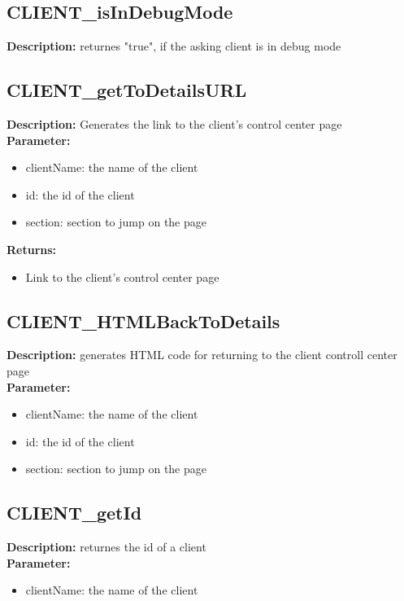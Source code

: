 \subsection{CLIENT\_isInDebugMode}
\textbf{Description:} returnes "true", if the asking client is in debug mode\\

\subsection{CLIENT\_getToDetailsURL}
\textbf{Description:} Generates the link to the client's control center page\\
\textbf{Parameter:}
\begin{itemize}
\item clientName: the name of the client
\item id: the id of the client
\item section: section to jump on the page
\end{itemize}
\textbf{Returns:}
\begin{itemize}
\item Link to the client's control center page
\end{itemize}

\subsection{CLIENT\_HTMLBackToDetails}
\textbf{Description:} generates HTML code for returning to the client controll center page\\
\textbf{Parameter:}
\begin{itemize}
\item clientName: the name of the client
\item id: the id of the client
\item section: section to jump on the page
\end{itemize}

\subsection{CLIENT\_getId}
\textbf{Description:} returnes the id of a client\\
\textbf{Parameter:}
\begin{itemize}
\item clientName: the name of the client
\end{itemize}

